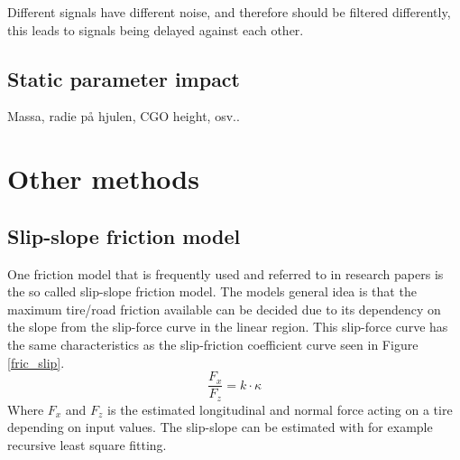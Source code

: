 Different signals have different noise, and therefore should be filtered differently, this leads to signals being delayed against each other. 

\subsection{Static parameter impact}

Massa, radie på hjulen, CGO height, osv..

\section{Other methods}

\subsection{Slip-slope friction model}

One friction model that is frequently used and referred to in research papers is the so called slip-slope friction model. The models general idea is that the maximum tire/road friction available can be decided due to its dependency on the slope from the slip-force curve in the linear region. This slip-force curve has the same characteristics as the slip-friction coefficient curve seen in Figure \ref{fric_slip}. 
\begin{equation}
\dfrac{F_{x}}{F_{z}} = k \cdot \kappa
\end{equation}
Where $ F_{x} $ and $ F_{z} $ is the estimated longitudinal and normal force acting on a tire depending on input values. The slip-slope can be estimated with for example recursive least square fitting.
